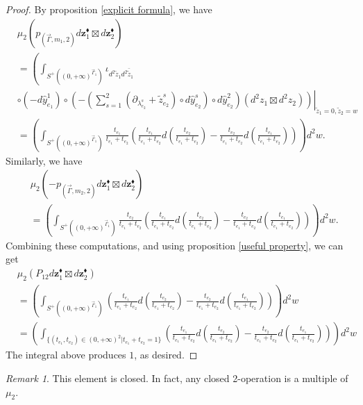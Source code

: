 \documentclass[11pt]{amsart}
\theoremstyle{definition}
\theoremstyle{remark}
\newtheorem{rem}[thm]{Remark}
\numberwithin{equation}{section}
\begin{document}
\begin{proof}
          By proposition \ref{explicit formula}, we have
        \begin{align*}
            &\mu_{2}(p_{(\vec{\Gamma},m_{1},2)} d \mathbf{z}^{\blacklozenge}_{1}\boxtimes d \mathbf{z}^{\blacklozenge}_{2}) \\
            &=\left(\int_{S^{+}((0,+\infty)^{\vec{\Gamma}_{1}})}
        \iota_{d^{2}\tilde{z}_{1}d^{2}\bar{\tilde{z}}_{1}}\right.\\
        &\left.\left.\circ (-d\hat{y}_{e_{1}}^{1})\circ(-(\sum_{s=1}^{2}(\partial_{\lambda_{e_{2}}^{s}}+\tilde{z}_{e_{2}}^{s})\circ d\hat{y}_{e_{2}}^{s})\circ d\hat{y}_{e_{2}}^{2})
        (d^{2}z_{1}\boxtimes d^{2}z_{2})\right)\right|_{\tilde{z}_{1}=0,\tilde{z}_{2}=w}\\
        &=
        \left(\int_{S^{+}((0,+\infty)^{\vec{\Gamma}_{1}})}\frac{t_{e_{1}}}{t_{e_{1}}+t_{e_{2}}}\left(\frac{t_{e_{1}}}{t_{e_{1}}+t_{e_{2}}}d(\frac{t_{e_{2}}}{t_{e_{1}}+t_{e_{2}}})-\frac{t_{e_{2}}}{t_{e_{1}}+t_{e_{2}}}d(\frac{t_{e_{1}}}{t_{e_{1}}+t_{e_{2}}})\right)\right)d^{2}w.
        \end{align*}
        Similarly, we have
        \begin{align*}
            &\mu_{2}(-p_{(\vec{\Gamma},m_{2},2)}
            d \mathbf{z}^{\blacklozenge}_{1}\boxtimes d \mathbf{z}^{\blacklozenge}_{2})\\
            &=
        \left(\int_{S^{+}((0,+\infty)^{\vec{\Gamma}_{1}})}\frac{t_{e_{2}}}{t_{e_{1}}+t_{e_{2}}}\left(\frac{t_{e_{1}}}{t_{e_{1}}+t_{e_{2}}}d(\frac{t_{e_{2}}}{t_{e_{1}}+t_{e_{2}}})-\frac{t_{e_{2}}}{t_{e_{1}}+t_{e_{2}}}d(\frac{t_{e_{1}}}{t_{e_{1}}+t_{e_{2}}})\right)\right)d^{2}w.
        \end{align*}
        Combining these computations, and using proposition \ref{useful property}, we can get
        \begin{align*}
            &\mu_{2}(P_{12}
            d \mathbf{z}^{\blacklozenge}_{1}\boxtimes d \mathbf{z}^{\blacklozenge}_{2})\\
            &=
        \left(\int_{S^{+}((0,+\infty)^{\vec{\Gamma}_{1}})}\left(\frac{t_{e_{1}}}{t_{e_{1}}+t_{e_{2}}}d(\frac{t_{e_{2}}}{t_{e_{1}}+t_{e_{2}}})-\frac{t_{e_{2}}}{t_{e_{1}}+t_{e_{2}}}d(\frac{t_{e_{1}}}{t_{e_{1}}+t_{e_{2}}})\right)\right)d^{2}w\\
        &=\left(\int_{\{(t_{e_{1}},t_{e_{2}})\in (0,+\infty)^2|t_{e_{1}}+t_{e_{2}}=1\}}\left(\frac{t_{e_{1}}}{t_{e_{1}}+t_{e_{2}}}d(\frac{t_{e_{2}}}{t_{e_{1}}+t_{e_{2}}})-\frac{t_{e_{2}}}{t_{e_{1}}+t_{e_{2}}}d(\frac{t_{e_{1}}}{t_{e_{1}}+t_{e_{2}}})\right)\right)d^{2}w
        \end{align*}
        The integral above produces $1$, as desired.
    \end{proof}
\begin{rem}
    This element is closed. In fact, any closed 2-operation is a multiple of $\mu_2$.
\end{rem}
\end{document}
